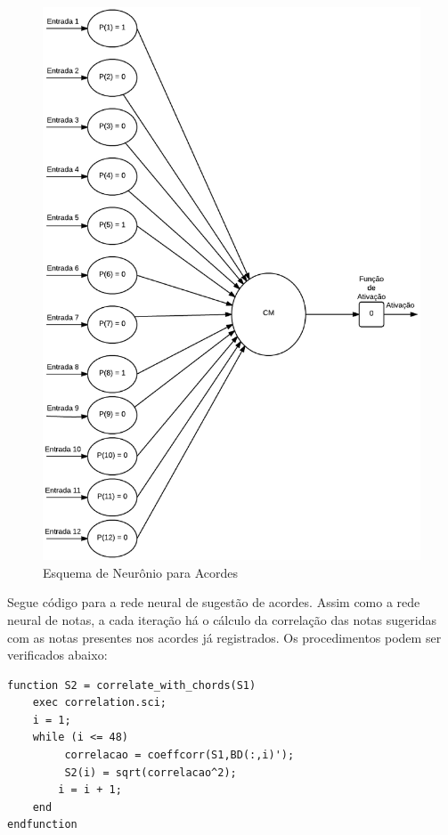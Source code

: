 \begin{figure}[t]
	\centering
		\includegraphics[keepaspectratio=true,scale=0.25]{figuras/neuron_chord}
	\caption{Esquema de Neurônio para Acordes}
\end{figure}


\newpage
Segue código para a rede neural de sugestão de acordes. Assim como a rede neural de notas, a cada iteração há o cálculo da correlação das notas sugeridas com as notas presentes nos acordes já registrados. Os procedimentos podem ser verificados abaixo:

\begin{lstlisting}
function S2 = correlate_with_chords(S1)
	exec correlation.sci;
	i = 1;
	while (i <= 48)
	     correlacao = coeffcorr(S1,BD(:,i)');
	     S2(i) = sqrt(correlacao^2);
	    i = i + 1;
	end
endfunction
\end{lstlisting}

